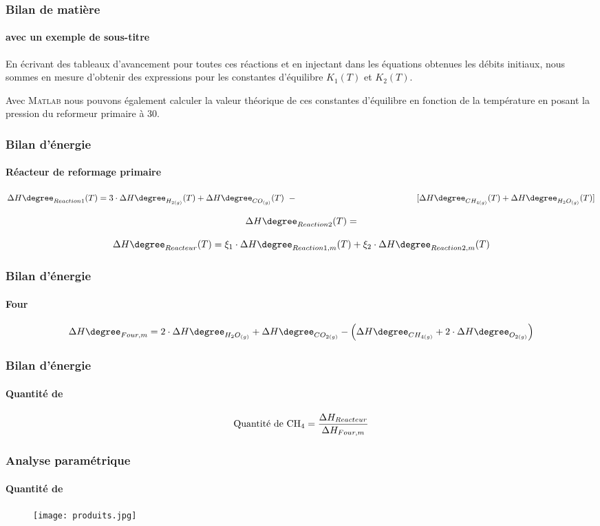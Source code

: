 \documentclass{beamer}
\begin{document}
\begin{frame}
\frametitle{Bilan de matière}
\framesubtitle{avec un exemple de sous-titre}

En écrivant des tableaux d'avancement pour toutes ces réactions et en injectant dans les équations obtenues les débits initiaux, nous sommes en mesure d'obtenir des expressions pour les constantes d'équilibre $K_1(T)$ et $K_2(T)$.

Avec \textsc{Matlab} nous pouvons également calculer la valeur théorique de ces constantes d'équilibre en fonction de la température en posant la pression du reformeur primaire à \unit{30}{\bbar}.

\end{frame}



\begin{frame}
\frametitle{Bilan d'énergie}
\framesubtitle{Réacteur de reformage primaire}



$$\Delta H\degree_{Reaction1}(T)=3 \cdot \Delta H\degree_{H_{2(g)}}(T) + \Delta H\degree_{CO_{(g)}}(T) ~- \\ ~~~~~~~~~~~~~~~~~~~~~~~~~~~~~~~~~~~~~~~~~~
\lbrack\Delta H\degree_{CH_{4(g)}}(T) + \Delta H\degree_{H_{2}O_{(g)}}(T)\rbrack$$


$$\Delta H\degree_{Reaction2}(T)=$$


$$\Delta H\degree_{Reacteur}(T)=\xi_1\cdot\Delta H\degree_{Reaction1,m}(T)+\xi_2\cdot\Delta H\degree_{Reaction2,m}(T)$$

\end{frame}



\begin{frame}
\frametitle{Bilan d'énergie}
\framesubtitle{Four}

$$\Delta H\degree_{Four,m} = 2\cdot \Delta H\degree_{H_{2}O_{(g)}} + \Delta H\degree_{CO_{2(g)}}
- \left(\Delta H\degree_{CH_{4(g)}} + 2\cdot \Delta H\degree_{O_{2(g)}}\right)$$


\end{frame}


\begin{frame}
\frametitle{Bilan d'énergie}
\framesubtitle{Quantité de }

$$\text{Quantité de \ce{CH_4}} = \dfrac{\Delta H_{Reacteur}}{\Delta H_{Four,m}}$$


\end{frame}



\begin{frame}
\frametitle{Analyse paramétrique}
\framesubtitle{Quantité de }

\begin{figure}[ht!]
\centering
\texttt{[image: produits.jpg]}
\end{figure}


\end{frame}
\end{document}
